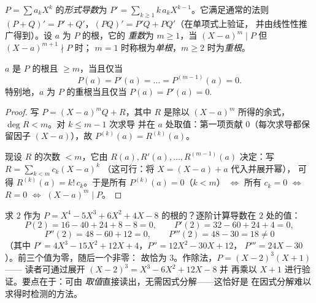 \begin{definition}[导数，重数]\label{def:b1:poly:derivative}
$P = \sum a_k X^k$ 的\emph{形式导数}为 $P' = \sum_{k
\geq 1} k\,a_k X^{k-1}$。它满足通常的法则 $(P+Q)' = P' +
Q'$，$(PQ)' = P'Q + PQ'$（在单项式上验证，
并由线性性推广得到）。设 $a$ 为 $P$ 的根，它的
\emph{重数}为 $m \geq 1$，当
$(X-a)^m \mid P$ 但 $(X-a)^{m+1} \nmid P$ 时；
$m = 1$ 时称根为\emph{单根}，$m \geq 2$ 时为\emph{重根}。
\end{definition}

\begin{proposition}[用导数刻画重数]\label{prop:b1:poly:multiplicity}
$a$ 是 $P$ 的根且 $\geq m$，当且仅当
\[
P(a) = P'(a) = \dots = P^{(m-1)}(a) = 0 .
\]
特别地，$a$ 为 $P$ 的重根当且仅当 $P(a) =
P'(a) = 0$.
\end{proposition}

\begin{proof}
写 $P = (X - a)^m Q + R$，其中 $R$ 是除以
$(X-a)^m$ 所得的余式，$\deg R < m$。对 $k \leq m - 1$ 次求导
并在 $a$ 处取值：第一项贡献 $0$（每次求导都保留因子
$(X-a)$），故 $P^{(k)}(a) = R^{(k)}(a)$。

现设 $R$ 的次数 $< m$，它由 $R(a), R'(a),
\dots, R^{(m-1)}(a)$ 决定：写 $R = \sum_{k < m} c_k (X - a)^k$
（这可行：将 $X = (X - a) + a$ 代入并展开幂），
可得 $R^{(k)}(a) = k!\, c_k$。于是所有 $P^{(k)}(a) = 0$（$k < m$）
$\iff$ 所有 $c_k = 0$ $\iff$ $R = 0$ $\iff$ $(X-a)^m \mid P$。
\end{proof}

\begin{example}[计算重数]\label{ex:b1:poly:multexample}
求 $2$ 作为 $P = X^4 - 5X^3 + 6X^2
+ 4X - 8$ 的根的？逐阶计算导数在 $2$ 处的值：
\[
P(2) = 16 - 40 + 24 + 8 - 8 = 0, \qquad
P'(2) = 32 - 60 + 24 + 4 = 0,
\]
\[
P''(2) = 48 - 60 + 12 = 0, \qquad
P'''(2) = 48 - 30 = 18 \neq 0
\]
（其中 $P' = 4X^3 - 15X^2 + 12X + 4$，$P'' = 12X^2 - 30X + 12$，
$P''' = 24X - 30$）。前三个值为零，随后一个非零：
故恰为 $3$。作除法，$P = (X - 2)^3(X + 1)$——
读者可通过展开 $(X-2)^3 = X^3 - 6X^2 + 12X - 8$ 并
再乘以 $X + 1$ 进行验证。要点在于：可由
\emph{取值}直接读出，无需因式分解——这恰好是
在因式分解难以求得时检测的方法。
\end{example}

